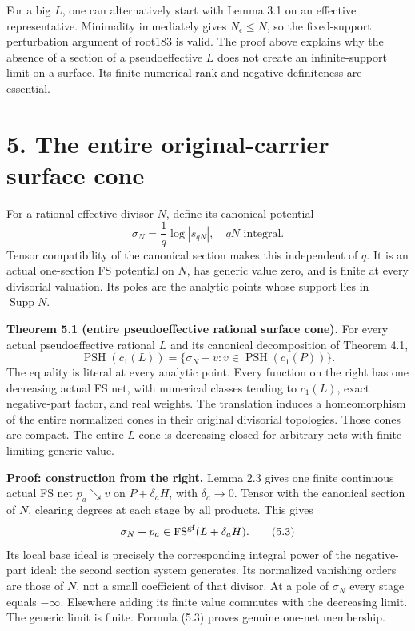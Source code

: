 \documentclass[
  10pt,
]{article}
\begin{document}
For a big \(L\), one can alternatively start with Lemma 3.1 on an
effective representative. Minimality immediately gives
\(N_\epsilon\leq N\), so the fixed-support perturbation argument of
root183 is valid. The proof above explains why the absence of a section
of a pseudoeffective \(L\) does not create an infinite-support limit on
a surface. Its finite numerical rank and negative definiteness are
essential.

\section{5. The entire original-carrier surface
cone}\label{the-entire-original-carrier-surface-cone}

For a rational effective divisor \(N\), define its canonical potential
\[
 \sigma_N=\frac1q\log|s_{qN}|,
                   \quad qN\text{ integral}.                    \tag{5.1}
\] Tensor compatibility of the canonical section makes this independent
of \(q\). It is an actual one-section FS potential on \(N\), has generic
value zero, and is finite at every divisorial valuation. Its poles are
the analytic points whose support lies in \(\operatorname{Supp}N\).

\textbf{Theorem 5.1 (entire pseudoeffective rational surface cone).} For
every actual pseudoeffective rational \(L\) and its canonical
decomposition of Theorem 4.1, \[
 \operatorname{PSH}(c_1(L))
       =\{\sigma_N+v:v\in\operatorname{PSH}(c_1(P))\}.           \tag{5.2}
\] The equality is literal at every analytic point. Every function on
the right has one decreasing actual FS net, with numerical classes
tending to \(c_1(L)\), exact negative-part factor, and real weights. The
translation induces a homeomorphism of the entire normalized cones in
their original divisorial topologies. Those cones are compact. The
entire \(L\)-cone is decreasing closed for arbitrary nets with finite
limiting generic value.

\textbf{Proof: construction from the right.} Lemma 2.3 gives one finite
continuous actual FS net \(p_a\searrow v\) on \(P+\delta_aH\), with
\(\delta_a\to0\). Tensor with the canonical section of \(N\), clearing
degrees at each stage by all products. This gives \[
 \sigma_N+p_a\in\operatorname{FS}^{\rm gf}(L+\delta_aH).         \tag{5.3}
\] Its local base ideal is precisely the corresponding integral power of
the negative-part ideal: the second section system generates. Its
normalized vanishing orders are those of \(N\), not a small coefficient
of that divisor. At a pole of \(\sigma_N\) every stage equals
\(-\infty\). Elsewhere adding its finite value commutes with the
decreasing limit. The generic limit is finite. Formula (5.3) proves
genuine one-net membership.
\end{document}
